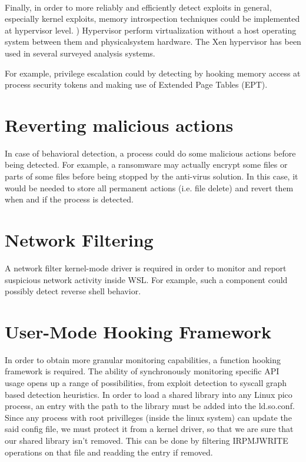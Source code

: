         \paragraph{}
        Finally, in order to more reliably and efficiently detect exploits in general, especially kernel exploits, memory introspection
        techniques could be implemented at hypervisor level. ) Hypervisor perform virtualization without a host operating system between them
        and physicalsystem hardware\cite{Bulazel}. The Xen hypervisor \cite{Barham} has been used in several surveyed analysis systems.
        
        For example, privilege escalation could by detecting by hooking memory access at process security tokens and making use of Extended
        Page Tables (EPT).
        
    \section{Reverting malicious actions}
        In case of behavioral detection, a process could do some malicious actions before being detected. For example, a ransomware may actually
        encrypt some files or parts of some files before being stopped by the anti-virus solution. In this case, it would be needed to store all
        permanent actions (i.e. file delete) and revert them when and if the process is detected.

    \section{Network Filtering}
        A network filter kernel-mode driver is required in order to monitor and report suspicious network activity inside WSL. For example, such
        a component could possibly detect reverse shell behavior.

    \section{User-Mode Hooking Framework}
        In order to obtain more granular monitoring capabilities, a function hooking framework is required. The ability of synchronously monitoring
        specific API usage opens up a range of possibilities, from exploit detection to syscall graph based detection heuristics.
        In order to load a shared library into any Linux pico process, an entry with the path to the library must be added into the ld.so.conf. Since
        any process with root privilleges (inside the linux system) can update the said config file, we must protect it from a kernel driver, so that
        we are sure that our shared library isn't removed. This can be done by filtering IRP\textunderscore MJ\textunderscore WRITE operations on that
        file and readding the entry if removed.
        
